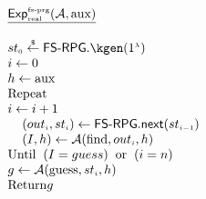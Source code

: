 

\

\begin{minipage}{57mm}
\begin{tcolorbox}[left=0mm]
$
  \begin{array}{l}
%
\underline{\mathsf{Exp}_{\sss \text{real}}^{\sss \text{fs-prg}}(\mathcal{A},\text{aux})}\\
%
\\
%
{st}_{\sss 0}\stackrel{\sss \$}\leftarrow \mathsf{FS\text{-}RPG}.\kgen(1^{\sss \lambda}) \\
%
i\gets 0\\ h\gets \text{aux} \\
\text {Repeat}\\
i\gets i+1\\
\hspace{4mm} ({out}_{\sss i}, st_{\sss i})\leftarrow    \mathsf{FS\text{-}RPG.next}    (st_{\sss i-1})\\
\hspace{4mm}  (I, h)\gets\mathcal{A}(\text{find}, out_{\sss i}, h)\\
\text{Until}\hspace{2mm}  (I=guess)\hspace{2mm}  \text{or} \hspace{2mm}  (i=n)\\
g\gets\mathcal{A}(\text{guess}, st_{\sss i}, h)\\
\text{Return} g\\
  \end{array}%
  \qquad$
  \end{tcolorbox}
   \end{minipage}
